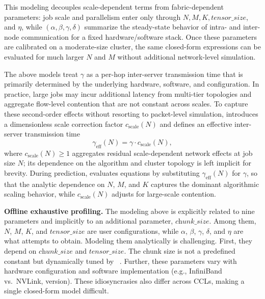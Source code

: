 This modeling decouples scale-dependent terms from fabric-dependent parameters: job scale and parallelism enter only through $N, M, K, \textit{tensor\_size}$, and $\eta$, while $(\alpha,\beta,\gamma,\delta)$ summarize the steady-state behavior of intra- and inter-node communication for a fixed hardware/software stack. Once these parameters are calibrated on a moderate-size cluster, the same closed-form expressions can be evaluated for much larger $N$ and $M$ without additional network-level simulation.

The above models treat $\gamma$ as a per-hop inter-server transmission time that is primarily determined by the underlying hardware, software, and \nccl configuration. In practice, large jobs may incur additional latency from multi-tier topologies and aggregate flow-level contention that are not constant across scales. To capture these second-order effects without resorting to packet-level simulation, \sys introduces a dimensionless scale correction factor $c_{\mathrm{scale}}(N)$ and defines an effective inter-server transmission time
\begin{equation}
\gamma_{\mathrm{eff}}(N)
  = \gamma \cdot c_{\mathrm{scale}}(N),
\label{eq:gamma_eff}
\end{equation}
where $c_{\mathrm{scale}}(N) \geq 1$ aggregates residual scale-dependent network effects at job size $N$; its dependence on the \nccl algorithm and cluster topology is left implicit for brevity. During prediction, \sys evaluates equations by substituting $\gamma_{\mathrm{eff}}(N)$ for $\gamma$, so that the analytic dependence on $N$, $M$, and $K$ captures the dominant algorithmic scaling behavior, while $c_{\mathrm{scale}}(N)$ adjusts for large-scale contention.

\noindent\textbf{Offline exhaustive profiling.}
The modeling above is explicitly related to nine parameters and implicitly to an additional parameter, $\textit{chunk\_size}$. Among them, $N$, $M$, $K$, and $\textit{tensor\_size}$ are user configurations, while $\alpha$, $\beta$, $\gamma$, $\delta$, and $\eta$ are what \sys attempts to obtain. Modeling them analytically is challenging. First, they depend on $\textit{chunk\_size}$ and $\textit{tensor\_size}$. The chunk size is not a predefined constant but dynamically tuned by \nccl~\cite{nccl}. Further, these parameters vary with hardware configuration and software implementation (e.g., InfiniBand vs.\ NVLink, \nccl version). These idiosyncrasies also differ across CCLs, making a single closed-form model difficult.

